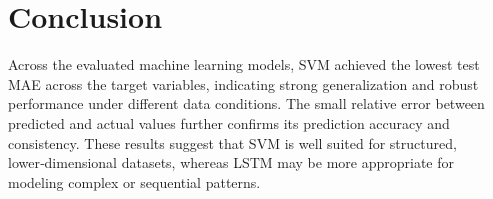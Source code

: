 \documentclass[twoside]{article}
\begin{document}
\section{Conclusion}%
Across the evaluated machine learning models, SVM achieved the lowest test MAE across the target variables, indicating strong generalization and robust performance under different data conditions. The small relative error between predicted and actual values further confirms its prediction accuracy and consistency. These results suggest that SVM is well suited for structured, lower‑dimensional datasets, whereas LSTM may be more appropriate for modeling complex or sequential patterns.%
\end{document}
